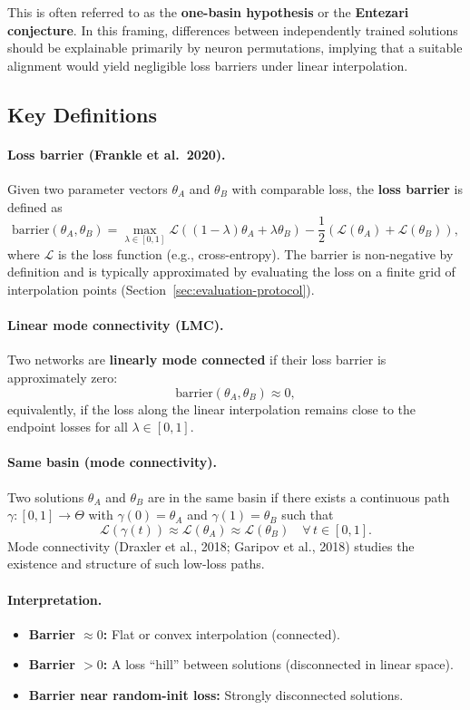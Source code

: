 \documentclass[11pt,a4paper]{article}
\begin{document}
This is often referred to as the \textbf{one-basin hypothesis} or the \textbf{Entezari conjecture}. In this framing, differences between independently trained solutions should be explainable primarily by neuron permutations, implying that a suitable alignment would yield negligible loss barriers under linear interpolation.

\subsection{Key Definitions}

\paragraph{Loss barrier (Frankle et al.\ 2020).}
Given two parameter vectors $\theta_A$ and $\theta_B$ with comparable loss, the \textbf{loss barrier} is defined as
\[
\text{barrier}(\theta_A, \theta_B) = \max_{\lambda \in [0,1]} \mathcal{L}\!\left((1-\lambda)\theta_A + \lambda \theta_B\right)
 - \frac{1}{2}\left(\mathcal{L}(\theta_A) + \mathcal{L}(\theta_B)\right),
\]
where $\mathcal{L}$ is the loss function (e.g., cross-entropy). The barrier is non-negative by definition and is typically approximated by evaluating the loss on a finite grid of interpolation points (Section~\ref{sec:evaluation-protocol}).

\paragraph{Linear mode connectivity (LMC).}
Two networks are \textbf{linearly mode connected} if their loss barrier is approximately zero:
\[
\text{barrier}(\theta_A, \theta_B) \approx 0,
\]
equivalently, if the loss along the linear interpolation remains close to the endpoint losses for all $\lambda \in [0,1]$.

\paragraph{Same basin (mode connectivity).}
Two solutions $\theta_A$ and $\theta_B$ are in the same basin if there exists a continuous path $\gamma : [0,1] \to \Theta$ with $\gamma(0)=\theta_A$ and $\gamma(1)=\theta_B$ such that
\[
\mathcal{L}(\gamma(t)) \approx \mathcal{L}(\theta_A) \approx \mathcal{L}(\theta_B) \quad \forall\, t \in [0,1].
\]
Mode connectivity (Draxler et al., 2018; Garipov et al., 2018) studies the existence and structure of such low-loss paths.

\paragraph{Interpretation.}
\begin{itemize}
    \item \textbf{Barrier $\approx 0$:} Flat or convex interpolation (connected).
    \item \textbf{Barrier $> 0$:} A loss ``hill'' between solutions (disconnected in linear space).
    \item \textbf{Barrier near random-init loss:} Strongly disconnected solutions.
\end{itemize}
\end{document}
